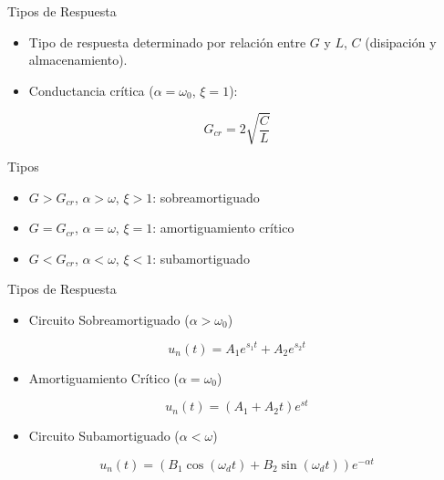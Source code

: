 \documentclass[aspectratio=169, usenames,svgnames,dvipsnames]{beamer}
\begin{document}
\begin{frame}[label={sec:orge3df067}]{Tipos de Respuesta}
\begin{itemize}
\item Tipo de respuesta determinado por relación entre \(G\) y \(L\), \(C\) (disipación y almacenamiento).
\item Conductancia crítica (\(\alpha = \omega_0\), \(\xi = 1\)):
\end{itemize}

\[
  G_{cr} = 2\sqrt{\frac{C}{L}}
\]

\begin{block}{Tipos}
\begin{itemize}
\item \(G > G_{cr}\), \(\alpha > \omega\), \(\xi > 1\): \alert{sobreamortiguado}
\item \(G = G_{cr}\),  \(\alpha = \omega\), \(\xi = 1\): \alert{amortiguamiento crítico}
\item \(G < G_{cr}\),  \(\alpha < \omega\), \(\xi < 1\): \alert{subamortiguado}
\end{itemize}
\end{block}
\end{frame}

\begin{frame}[label={sec:orgef97b10}]{Tipos de Respuesta}
\begin{itemize}
\item Circuito Sobreamortiguado (\(\alpha > \omega_0\))
\end{itemize}
\[
  u_n(t) = A_1 e^{s_1 t} + A_2 e^{s_2 t}
\]
\begin{itemize}
\item Amortiguamiento Crítico (\(\alpha = \omega_0\))
\end{itemize}
\[
  u_n(t) = (A_1 + A_2 t) e^{s t} 
\]

\begin{itemize}
\item Circuito Subamortiguado (\(\alpha < \omega\))
\end{itemize}
\[
  u_n(t) = (B_1\cos(\omega_d t) + B_2\sin(\omega_d t)) e^{-\alpha t}
\]
\end{frame}
\end{document}
